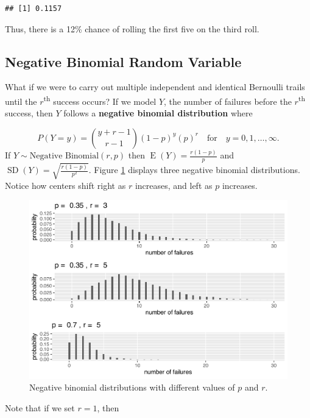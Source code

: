 \documentclass[
]{krantz}
\newcommand{\E}{\operatorname{E}}
\newcommand{\SD}{\operatorname{SD}}
\begin{document}
\begin{verbatim}
## [1] 0.1157
\end{verbatim}

Thus, there is a 12\% chance of rolling the first five on the third roll.

\subsection{Negative Binomial Random Variable}\label{negative-binomial-random-variable}

What if we were to carry out multiple independent and identical Bernoulli trails until the \(r\)\textsuperscript{th} success occurs?
If we model \(Y\), the number of failures before the \(r\)\textsuperscript{th} success, then \(Y\) follows a \textbf{negative binomial distribution}  where

\begin{equation}
P(Y=y) = \binom{y + r - 1}{r-1} (1-p)^{y}(p)^r \quad \textrm{for}\quad y = 0, 1, \ldots, \infty.
\label{eq:nBinomRV}
\end{equation}
If \(Y \sim \textrm{Negative Binomial}(r, p)\) then \(\E(Y) = \frac{r(1-p)}{p}\) and \(\SD(Y) = \sqrt{\frac{r(1-p)}{p^2}}\). Figure \ref{fig:multNBinom} displays three negative binomial distributions. Notice how centers shift right as \(r\) increases, and left as \(p\) increases.



\begin{figure}

{\centering \includegraphics[width=0.6\linewidth]{bookdown-BeyondMLR_files/figure-latex/multNBinom-1} 

}

\caption{Negative binomial distributions with different values of \(p\) and \(r\).}\label{fig:multNBinom}
\end{figure}

Note that if we set \(r=1\), then
\end{document}
